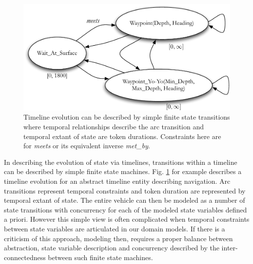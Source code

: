\begin{figure}
\centering
\includegraphics[scale=0.3]{figs/FSM-transition.pdf}
\caption{\small Timeline evolution can be described by simple finite
  state transitions where temporal relationships describe the arc
  transition and temporal extant of state are token
  durations. Constraints here are for \emph{meets} or its equivalent
  inverse \emph{met\_by}.}
\label{fig:FSM}
\vskip-0.3cm
\end{figure}

In describing the evolution of state via timelines, transitions within
a timeline can be described by simple finite state
machines. Fig. \ref{fig:FSM} for example describes a timeline
evolution for an abstract timeline entity describing navigation. Arc
transitions represent temporal constraints and token duration are
represented by temporal extant of state. The entire vehicle can then
be modeled as a number of state transitions with concurrency for each
of the modeled state variables defined a priori. However this simple
view is often complicated when temporal constraints between state
variables are articulated in our domain models. If there is a
criticism of this approach, modeling then, requires a proper balance
between abstraction, state variable description and concurrency
described by the inter-connectedness between such finite state
machines. 



